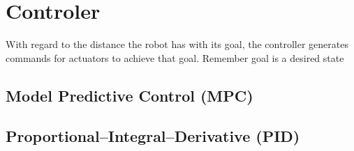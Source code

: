 \chapter{Controler}

With regard to the distance the robot has with its goal, the controller generates commands for actuators to achieve that goal. Remember goal is a desired state
\section{Model Predictive Control (MPC)}
\section{Proportional–Integral–Derivative (PID)}